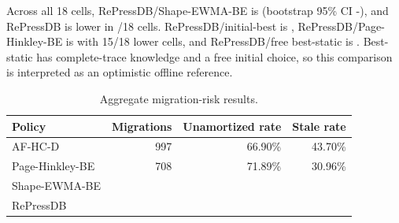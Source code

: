 \documentclass[preprint,12pt,authoryear]{elsarticle}
\begin{document}
\begin{table}[H]
\centering
\caption{Multi-seed replay results.}
\end{table}

Across all 18 cells, RePressDB/Shape-EWMA-BE is \ReplayRepressShapeRatio{} (bootstrap 95\% CI \ReplayRepressShapeLow-\ReplayRepressShapeHigh), and RePressDB is lower in \ReplayRepressShapeWins{}/18 cells. RePressDB/initial-best is \ReplayRepressInitialRatio, RePressDB/Page-Hinkley-BE is \ReplayRepressPHRatio{} with 15/18 lower cells, and RePressDB/free best-static is \ReplayRepressBestStaticRatio. Best-static has complete-trace knowledge and a free initial choice, so this comparison is interpreted as an optimistic offline reference.

\begin{table}[H]
\centering
\caption{Aggregate migration-risk results.}
\begin{tabular}{@{}lrrr@{}}
\toprule
Policy & Migrations & Unamortized rate & Stale rate \\
\midrule
AF-HC-D & 997 & 66.90\% & 43.70\% \\
Page-Hinkley-BE & 708 & 71.89\% & 30.96\% \\
Shape-EWMA-BE & \ReplayShapeMigrations{} & \ReplayShapeUnamortized{} & \ReplayShapeStale{} \\
RePressDB & \ReplayRepressMigrations{} & \ReplayRepressUnamortized{} & \ReplayRepressStale{} \\
\bottomrule
\end{tabular}
\end{table}
\end{document}

